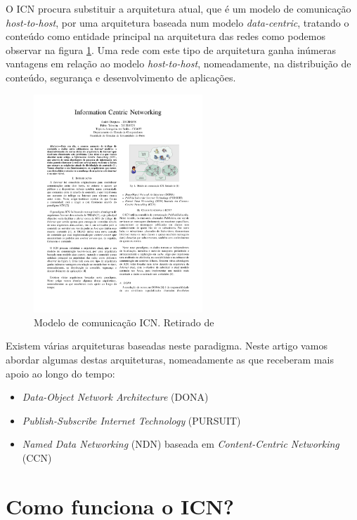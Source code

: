 \documentclass[conference]{IEEEtran}
\begin{document}
O ICN procura substituir a arquitetura atual, que \'{e} um modelo de comunica\c{c}\~{a}o \textit{host-to-host}, por uma arquitetura baseada num modelo \textit{data-centric}, tratando o conte\'{u}do como entidade principal na arquitetura das redes como podemos observar na figura \ref{icn}. Uma rede com este tipo de arquitetura ganha in\'{u}meras vantagens em rela\c{c}\~{a}o ao modelo \textit{host-to-host}, nomeadamente, na distribui\c{c}\~{a}o de conte\'{u}do, seguran\c{c}a e desenvolvimento de aplica\c{c}\~{o}es\cite{icn}.\\

\begin{figure}[!t]
\centering
\includegraphics[width=2.5in]{icn}
\caption{Modelo de comunica\c{c}\~{a}o ICN. Retirado de \cite{ahlgren}}
\label{icn}
\end{figure}

Existem v\'{a}rias arquiteturas baseadas neste paradigma. Neste artigo vamos abordar algumas destas arquiteturas, nomeadamente as que receberam mais apoio ao longo do tempo: \\

\begin{itemize}
\item \textit{Data-Object Network Architecture} (DONA)
\item \textit{Publish-Subscribe Internet Technology} (PURSUIT)
\item \textit{Named Data Networking} (NDN) baseada em \textit{Content-Centric Networking} (CCN) 
\end{itemize}



\section{Como funciona o ICN?}
\end{document}

